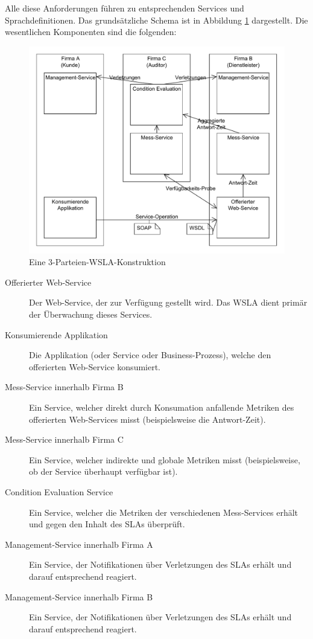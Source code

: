 \documentclass[11pt,listof=totoc]{scrreprt} %
\theoremstyle{definition}
\begin{document}
Alle diese Anforderungen führen zu entsprechenden Services und Sprachdefinitionen. Das grundsätzliche Schema ist in Abbildung \ref{wslaone} dargestellt. Die wesentlichen Komponenten sind die folgenden:

\begin{figure}
\caption{Eine 3-Parteien-WSLA-Konstruktion}
\label{wslaone}
\includegraphics[scale=0.6]{diagramme/wsla_basic.pdf}
\end{figure}

\begin{description}
\item[Offerierter Web-Service] Der Web-Service, der zur Verfügung gestellt wird. Das WSLA dient primär der Überwachung dieses Services.
\item[Konsumierende Applikation] Die Applikation (oder Service oder Business-Prozess), welche den offerierten Web-Service konsumiert.
\item[Mess-Service innerhalb Firma B] Ein Service, welcher direkt durch Konsumation anfallende Metriken des offerierten Web-Services misst (beispielsweise die Antwort-Zeit).
\item[Mess-Service innerhalb Firma C] Ein Service, welcher indirekte und globale Metriken misst (beispielsweise, ob der Service überhaupt verfügbar ist).
\item[Condition Evaluation Service] Ein Service, welcher die Metriken der verschiedenen Mess-Services erhält und gegen den Inhalt des SLAs überprüft.
\item[Management-Service innerhalb Firma A] Ein Service, der Notifikationen über Verletzungen des SLAs erhält und darauf entsprechend reagiert.
\item[Management-Service innerhalb Firma B] Ein Service, der Notifikationen über Verletzungen des SLAs erhält und darauf entsprechend reagiert.
\end{description}
\end{document}
